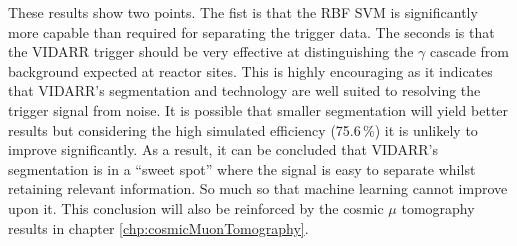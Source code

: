 These results show two points. The fist is that the RBF SVM is significantly more capable than required for separating the trigger data. The seconds is that the VIDARR trigger should be very effective at distinguishing the $\gamma$ cascade from background expected at reactor sites. This is highly encouraging as it indicates that VIDARR's segmentation and technology are well suited to resolving the trigger signal from noise. It is possible that smaller segmentation will yield better results but considering the high simulated efficiency (75.6\,\%) it is unlikely to improve significantly. As a result, it can be concluded that VIDARR's segmentation is in a ``sweet spot'' where the signal is easy to separate whilst retaining relevant information. So much so that machine learning cannot improve upon it. This conclusion will also be reinforced by the cosmic $\mu$ tomography results in chapter \ref{chp:cosmicMuonTomography}.



